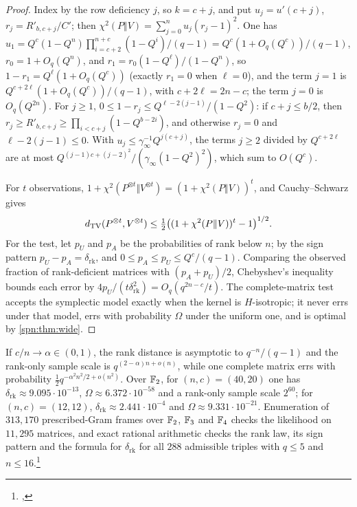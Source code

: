 \begin{proof}
Index by the row deficiency $j$, so $k=c+j$, and put $u_j=u'(c+j)$, $r_j=R'_{b,c+j}/C'$; then
$\chi^2(P\Vert V)=\sum_{j=0}^nu_j(r_j-1)^2$. One has
$u_1=Q^c(1-Q^n)\prod_{i=c+2}^{n+c}(1-Q^i)/(q-1)=Q^c(1+O_q(Q^c))/(q-1)$, $r_0=1+O_q(Q^n)$, and
$r_1=r_0(1-Q^\ell)/(1-Q^n)$, so $1-r_1=Q^\ell(1+O_q(Q^c))$ (exactly $r_1=0$ when $\ell=0$), and the term
$j=1$ is $Q^{c+2\ell}(1+O_q(Q^c))/(q-1)$, with $c+2\ell=2n-c$; the term $j=0$ is $O_q(Q^{2n})$. For
$j\ge1$, $0\le1-r_j\le Q^{\ell-2(j-1)}/(1-Q^2)$: if $c+j\le b/2$, then
$r_j\ge R'_{b,c+j}\ge\prod_{i<c+j}(1-Q^{b-2i})$, and otherwise $r_j=0$ and $\ell-2(j-1)\le0$. With
$u_j\le \gamma_\infty^{-1}Q^{j(c+j)}$, the terms $j\ge2$ divided by $Q^{c+2\ell}$ are at most
$Q^{(j-1)c+(j-2)^2}/(\gamma_\infty(1-Q^2)^2)$, which sum to $O(Q^c)$.

For $t$ observations, $1+\chi^2(P^{\otimes t}\Vert V^{\otimes t})=(1+\chi^2(P\Vert V))^t$, and
Cauchy--Schwarz gives
\[
 d_{\mathrm{TV}}(P^{\otimes t},V^{\otimes t})\le\tfrac12\bigl((1+\chi^2(P\Vert V))^t-1\bigr)^{1/2}.
\]
For the test, let $p_U$ and $p_A$ be the probabilities of rank below $n$; by the sign pattern $p_U-p_A=\delta_{\mathrm{rk}}$,
and $0\le p_A\le p_U\le Q^c/(q-1)$. Comparing the observed fraction of rank-deficient matrices with
$(p_A+p_U)/2$, Chebyshev's inequality bounds each error by
$4p_U/(t\delta_{\mathrm{rk}}^2)=O_q(q^{2n-c}/t)$. The complete-matrix test accepts the symplectic model
exactly when the kernel is $H$-isotropic; it never errs under that model, errs with probability
$\Omega$ under the uniform one, and is optimal by \cref{spn:thm:wide}.
\end{proof}

If $c/n\to\alpha\in(0,1)$, the rank distance is asymptotic to $q^{-n}/(q-1)$ and the rank-only sample
scale is $q^{(2-\alpha)n+o(n)}$, while one complete matrix errs with probability
$\tfrac12q^{-\alpha^2n^2/2+o(n^2)}$. Over $\mathbb{F}_2$, for $(n,c)=(40,20)$ one has
$\delta_{\mathrm{rk}}\approx9.095\cdot10^{-13}$, $\Omega\approx6.372\cdot10^{-58}$ and a rank-only sample
scale $2^{60}$; for $(n,c)=(12,12)$, $\delta_{\mathrm{rk}}\approx2.441\cdot10^{-4}$ and
$\Omega\approx9.331\cdot10^{-21}$. Enumeration of $313{,}170$ prescribed-Gram frames over $\mathbb{F}_2$, $\mathbb{F}_3$
and $\mathbb{F}_4$ checks the likelihood on $11{,}295$ matrices, and exact rational arithmetic checks the rank
law, its sign pattern and the formula for $\delta_{\mathrm{rk}}$ for all $288$ admissible triples with
$q\le5$ and $n\le16$.\footnote{\raggedright{},
}

